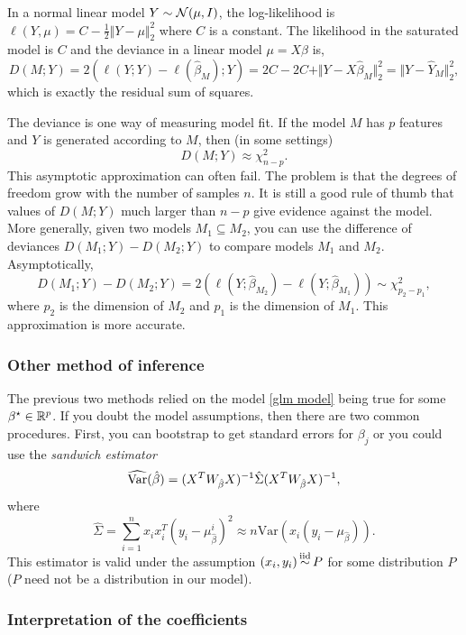 \begin{example}
    In a normal linear model $Y \sim {\mathcal N}(\mu,I)$, the log-likelihood is $\ell(Y,\mu) = C -\frac{1}{2}\Vert Y - \mu \Vert_2^2$ where $C$ is a constant. The likelihood in the saturated model is $C$ and the deviance in a linear model $\mu = X \beta$ is,
    \[D(M;Y) = 2(\ell(Y;Y)-\ell(\hat{\beta}_M);Y) = 2C - 2C + \Vert Y - X\hat{\beta}_M \Vert_2^2 = \Vert Y - \hat{Y}_M \Vert_2^2, \]
    which is exactly the residual sum of squares.
\end{example}
The deviance is one way of measuring model fit. If the model $M$ has $p$ features and $Y$ is generated according to $M$, then (in some settings)
\[D(M;Y) \approx \chi^2_{n-p}. \]
This asymptotic approximation can often fail. The problem is that the degrees of freedom grow with the number of samples $n$. It is still a good rule of thumb that values of $D(M;Y)$ much larger than $n-p$ give evidence against the model. More generally, given two models $M_1 \subseteq M_2$, you can use the difference of deviances $D(M_1;Y) - D(M_2;Y)$ to compare models $M_1$ and $M_2$. Asymptotically,
\[
    D(M_1;Y) - D(M_2;Y) = 2(\ell(Y;\hat{\beta}_{M_2}) - \ell(Y;\hat{\beta}_{M_1})) \sim \chi^2_{p_2-p_1}, 
\]
where $p_2$ is the dimension of $M_2$ and $p_1$ is the dimension of $M_1$. This approximation is more accurate.

\subsubsection*{Other method of inference}

The previous two methods relied on the model \eqref{glm model} being true for some $\beta^\star \in \mathbb{R}^p$. If you doubt the model assumptions, then there are two common procedures. First, you can bootstrap to get standard errors for $\beta_j$ or you could use the \emph{sandwich estimator} 
\[\widehat{\mathrm{Var}}(\hat{\beta}) = (X^TW_{\hat{\beta}}X)^{-1} \hat{\Sigma} (X^TW_{\hat{\beta}}X)^{-1}, \]
where
\[\hat{\Sigma} = \sum_{i=1}^n x_ix_i^T(y_i - \mu^i_{\hat{\beta}})^2 \approx n\text{Var}(x_i(y_i - \mu_{\hat{\beta}})). \]
This estimator is valid under the assumption $(x_i,y_i) \simiid P$ for some distribution $P$ ($P$ need not be a distribution in our model). 

\subsubsection*{Interpretation of the coefficients}

